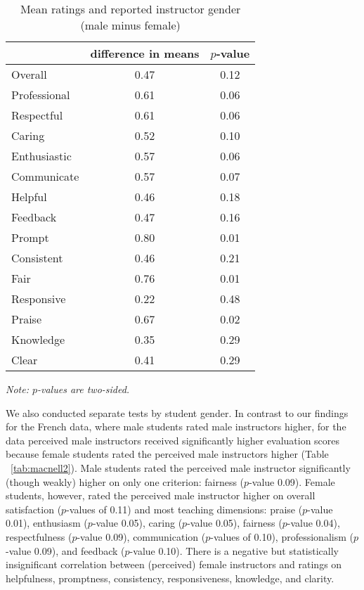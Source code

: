 \documentclass[12pt]{article}
\begin{document}
\begin{table}[htbp]
  \centering
  \footnotesize 
  \caption{Mean ratings and reported instructor gender (male minus female)}
    \begin{tabular}{lcc}
    \toprule 
                          & difference in means  & $p$-value  \\
   \midrule
    Overall &                 0.47       & 0.12   \\
    Professional &            0.61       & 0.06   \\
    Respectful			   &  0.61       & 0.06   \\
    Caring &                  0.52       & 0.10    \\
    Enthusiastic   &          0.57       & 0.06     \\
    Communicate        &      0.57       & 0.07     \\
    Helpful   &               0.46       & 0.18     \\
    Feedback   &              0.47       & 0.16     \\
    Prompt    &               0.80       & 0.01     \\
    Consistent   &            0.46       & 0.21     \\
    Fair   &                  0.76       & 0.01     \\
    Responsive   &            0.22       & 0.48     \\
    Praise   &                0.67       & 0.02     \\
    Knowledge   &             0.35       & 0.29     \\
    Clear   &                 0.41       & 0.29     \\
    \bottomrule
    \end{tabular}%
 \label{tab:macnell1}%
  
  \textit{Note: $p$-values are two-sided.}
\end{table}%
\normalsize


We also conducted separate tests by student gender.
In contrast to our findings for the French data, where male students 
rated male instructors higher, 
for the \citet{MacNell2014} data perceived male instructors received 
significantly higher evaluation scores because female students rated the perceived 
male instructors higher (Table ~\ref{tab:macnell2}). 
Male students rated the perceived male instructor significantly (though weakly) 
higher on only one criterion: fairness ($p$-value 0.09). 
Female students, however, rated the perceived male instructor higher on overall satisfaction 
($p$-values of 0.11) and most teaching dimensions: 
praise ($p$-value 0.01), 
enthusiasm ($p$-value 0.05), 
caring ($p$-value 0.05), 
fairness ($p$-value 0.04), 
respectfulness ($p$-value 0.09),  
communication ($p$-values of 0.10), 
professionalism ($p$-value 0.09), 
and feedback ($p$-value 0.10). 
There is a negative but statistically insignificant correlation between (perceived) 
female instructors
and ratings on helpfulness, promptness, consistency, responsiveness, 
knowledge, and clarity.
\end{document}
